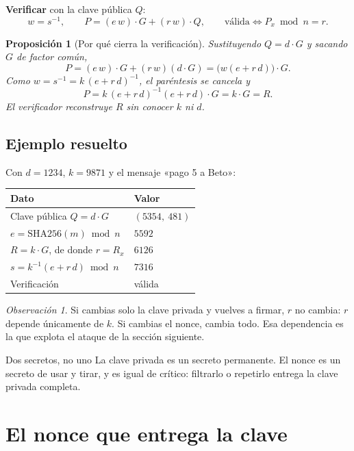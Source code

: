 \documentclass[11pt,a4paper]{article}
\theoremstyle{definition}
\theoremstyle{plain}
\newtheorem{proposicion}{Proposición}
\theoremstyle{remark}
\newtheorem*{observacion}{Observación}
\begin{document}
\textbf{Verificar} con la clave pública $Q$:
\[
  w = s^{-1}, \qquad P = (e\,w)\cdot G + (r\,w)\cdot Q,
  \qquad \text{válida} \iff P_x \bmod n = r.
\]

\begin{proposicion}[Por qué cierra la verificación]
Sustituyendo $Q = d\cdot G$ y sacando $G$ de factor común,
\[
  P = (e\,w)\cdot G + (r\,w)(d\cdot G) = \bigl(w(e + r\,d)\bigr)\cdot G.
\]
Como $w = s^{-1} = k\,(e + r\,d)^{-1}$, el paréntesis se cancela y
\[
  P = k\,(e+r\,d)^{-1}(e + r\,d)\cdot G = k\cdot G = R.
\]
El verificador reconstruye $R$ sin conocer $k$ ni $d$.
\end{proposicion}

\subsection{Ejemplo resuelto}

Con $d = 1234$, $k = 9871$ y el mensaje «pago 5 a Beto»:

\begin{center}
\small
\begin{tabular}{@{}ll@{}}
\toprule
Dato & Valor \\
\midrule
Clave pública $Q = d\cdot G$ & $(5354,\ 481)$ \\
$e = \mathrm{SHA256}(m) \bmod n$ & $5592$ \\
$R = k\cdot G$, de donde $r = R_x$ & $6126$ \\
$s = k^{-1}(e + r\,d) \bmod n$ & $7316$ \\
\midrule
Verificación & válida \\
\bottomrule
\end{tabular}
\end{center}

\begin{observacion}
Si cambias solo la clave privada y vuelves a firmar, $r$ no cambia: $r$ depende
únicamente de $k$. Si cambias el nonce, cambia todo. Esa dependencia es la que
explota el ataque de la sección siguiente.
\end{observacion}

\begin{aviso}{Dos secretos, no uno}
La clave privada es un secreto permanente. El nonce es un secreto de usar y
tirar, y es igual de crítico: filtrarlo o repetirlo entrega la clave privada
completa.
\end{aviso}

\section{El nonce que entrega la clave}\label{sec:nonce}
\end{document}
